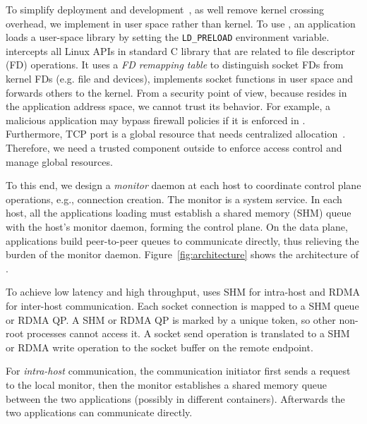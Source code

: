 To simplify deployment and development~\cite{andromeda}, as well remove kernel crossing overhead, we implement \sys in user space rather than kernel.
To use \sys, an application loads a user-space library \libipc{} by setting the \texttt{LD\_PRELOAD} environment variable. \libipc{} intercepts all Linux APIs in standard C library that are related to file descriptor (FD) operations. It uses a \emph{FD remapping table} to distinguish socket FDs from kernel FDs (e.g. file and devices), implements socket functions in user space and forwards others to the kernel.
From a security point of view, because \libipc{} resides in the application address space, we cannot trust its behavior. For example, a malicious application may bypass firewall policies if it is enforced in \libipc{}. Furthermore, TCP port is a global resource that needs centralized allocation~\cite{lin2016scalable,nsdi19freeflow}. Therefore, we need a trusted component outside \libipc{} to enforce access control and manage global resources.

To this end, we design a \emph{monitor} daemon at each host to coordinate control plane operations, e.g., connection creation. The monitor is a system service. In each host, all the applications loading \libipc{} must establish a shared memory (SHM) queue with the host's monitor daemon, forming the control plane. On the data plane, applications build peer-to-peer queues to communicate directly, thus relieving the burden of the monitor daemon. Figure~\ref{fig:architecture} shows the architecture of \sys{}.




To achieve low latency and high throughput, \sys{} uses SHM for intra-host and RDMA for inter-host communication.
Each socket connection is mapped to a SHM queue or RDMA QP.
A SHM or RDMA QP is marked by a unique token, so other non-root processes cannot access it.
A socket send operation is translated to a SHM or RDMA write operation to the socket buffer on the remote endpoint.

For \emph{intra-host} communication, the communication initiator first sends a request to the local monitor, then the monitor establishes a shared memory queue between the two applications (possibly in different containers). Afterwards the two applications can communicate directly.


